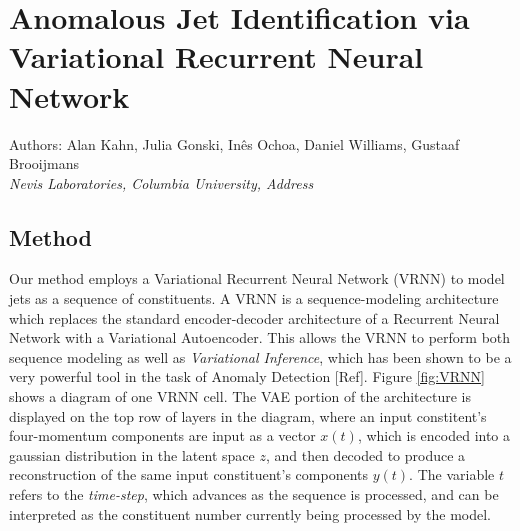 \documentclass[letterpaper,11pt]{article}
\begin{document}
\section*{Anomalous Jet Identification via Variational Recurrent Neural Network}
Authors: Alan Kahn, Julia Gonski, In\^{e}s Ochoa, Daniel Williams, Gustaaf Brooijmans \\ \textit{Nevis Laboratories, Columbia University, Address}\\


\subsection{Method}
\label{sec:method}

Our method employs a Variational Recurrent Neural Network (VRNN) to model jets as a sequence of constituents. A VRNN is a sequence-modeling architecture which replaces the standard encoder-decoder architecture of a Recurrent Neural Network with a Variational Autoencoder. This allows the VRNN to perform both sequence modeling as well as \textit{Variational Inference}, which has been shown to be a very powerful tool in the task of Anomaly Detection [Ref]. Figure \ref{fig:VRNN} shows a diagram of one VRNN cell. The VAE portion of the architecture is displayed on the top row of layers in the diagram, where an input constitent's four-momentum components are input as a vector $x(t)$, which is encoded into a gaussian distribution in the latent space $z$, and then decoded to produce a reconstruction of the same input constituent's components $y(t)$. The variable $t$ refers to the \textit{time-step}, which advances as the sequence is processed, and can be interpreted as the constituent number currently being processed by the model. 
\end{document}
